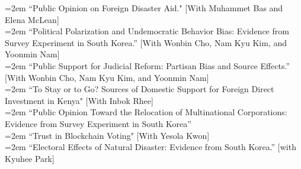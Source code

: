 \hangindent=2em ``Public Opinion on Foreign Disaster Aid." [With Muhammet Bas and Elena McLean] \\

 \hangindent=2em ``Political Polarization and Undemocratic Behavior Bias: Evidence from Survey Experiment in South Korea.'' [With Wonbin Cho, Nam Kyu Kim, and Yoonmin Nam] \\
 
  \hangindent=2em ``Public Support for Judicial Reform: Partisan Bias and Source Effects.'' [With Wonbin Cho, Nam Kyu Kim, and Yoonmin Nam] \\
  


\hangindent=2em ``To Stay or to Go? Sources of Domestic Support for Foreign Direct Investment in Kenya" [With Inbok Rhee]\\

\hangindent=2em ``Public Opinion Toward the Relocation of Multinational Corporations: Evidence from Survey Experiment in South Korea'' \\

\hangindent=2em ``Trust in Blockchain Voting" [With Yesola Kwon] \\

\hangindent=2em
``Electoral Effects of Natural Disaster: Evidence from South Korea.''  [with Kyuhee Park]





